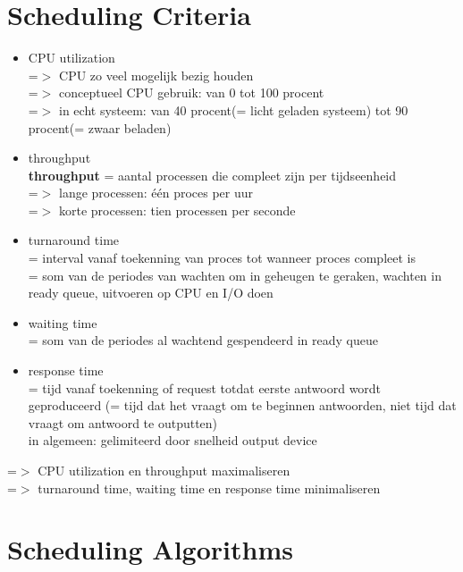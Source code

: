 \documentclass{report}
\begin{document}
\section{Scheduling Criteria}
\begin{itemize}
\item CPU utilization
\\=$>$ CPU zo veel mogelijk bezig houden
\\=$>$ conceptueel CPU gebruik: van 0 tot 100 procent
\\=$>$ in echt systeem: van 40 procent(= licht geladen systeem) tot 90 procent(= zwaar beladen)
\item throughput
\\\textbf{throughput} = aantal processen die compleet zijn per tijdseenheid
\\=$>$ lange processen: \'e\'en proces per uur
\\=$>$ korte processen: tien processen per seconde
\item turnaround time
\\= interval vanaf toekenning van proces tot wanneer proces compleet is 
\\= som van de periodes van wachten om in geheugen te geraken, wachten in ready queue, uitvoeren op CPU en I/O doen
\item waiting time
\\= som van de periodes al wachtend gespendeerd in ready queue
\item response time
\\= tijd vanaf toekenning of request totdat eerste antwoord wordt geproduceerd (= tijd dat het vraagt om te beginnen antwoorden, niet tijd dat vraagt om antwoord te outputten)
\\in algemeen: gelimiteerd door snelheid output device
\end{itemize}
=$>$ CPU utilization en throughput maximaliseren 
\\=$>$ turnaround time, waiting time en response time minimaliseren

\section{Scheduling Algorithms}
\end{document}
